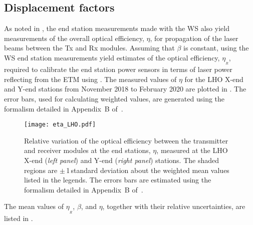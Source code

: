 \documentclass[12pt,a4paper,final]{iopart}
\begin{document}
 \subsection{Displacement factors}\label{subsec:ResultsForcecoeff}
As noted in , the end station measurements made with the WS also yield measurements of the overall optical efficiency, $\eta$,  for propagation of the laser beams between the Tx and Rx modules.  Assuming that $\beta$ is constant, using  the WS end station measurements yield estimates of the optical efficiency, $\eta_{_{R}}$, required to calibrate the end station power sensors in terms of laser power reflecting from the ETM using .   The measured values of $\eta$ for the LHO X-end and Y-end stations from November 2018 to February 2020 are plotted in .  The error bars, used for calculating weighted values, are generated using the formalism detailed in Appendix~B of~\cite{P1900127}.
%
\begin{figure}[t]%
    \begin{center}
\texttt{[image: eta\_LHO.pdf]}
    \caption{Relative variation of the optical efficiency between the transmitter and receiver modules at the end stations, $\eta$, measured at the LHO X-end ({\em left panel}) and Y-end ({\em right panel}) stations. The shaded regions are $\pm$\,1\,standard deviation about the weighted mean values listed in the legends. The errors bars are estimated using the formalism detailed in Appendix~B of~\cite{P1900127}.}
    \label{fig:etaLHO}
    \end{center}
\end{figure}
%
The mean values of $\eta_{_{R}}$, $\beta$, and $\eta$, together with their relative uncertainties, are listed in .
%
\end{document}
